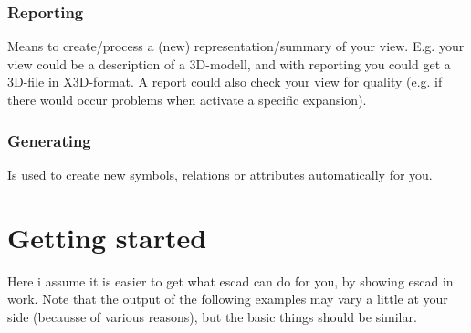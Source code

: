 \documentclass[a4paper, 12pt, openany]{scrbook}
\begin{document}
\subsection{Reporting}
Means to create/process a (new) representation/summary of your view. E.g. your view could be a description of a 3D-modell, and with reporting you could get a 3D-file in X3D-format. A report could also check your view for quality (e.g. if there would occur problems when activate a specific expansion).
\subsection{Generating}
Is used to create new symbols, relations or attributes automatically for you. 
\chapter{Getting started}\label{cha:gettingstarted}
Here i assume it is easier to get what escad can do for you, by showing escad in work. Note that the output of the following examples may vary a little at your side (becausse of various reasons), but the basic things should be similar.
\end{document}
